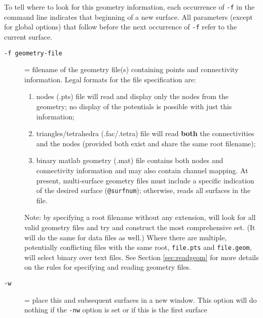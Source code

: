 To tell \map{} where to look for this geometry information, 
each occurrence of \texttt{-f} in the command line indicates that 
beginning of a new surface.  All parameters (except for global options)
that follow before the 
next occurrence of \texttt{-f} refer to the current surface.
%
\begin{description}
  \item[{\tt -f geometry-file} ]
    = filename of the geometry file(s) containing points and
    connectivity information.   Legal formats for the file specification 
    are: 
    \begin{enumerate}
      \item nodes (.pts) file will read and display only the 
        nodes from the geometry; no display of the potentials is 
        possible with just this information;
        
      \item triangles/tetrahedra (.fac/.tetra) file will read 
        \textbf{both} the connectivities and the nodes (provided
        both exist and share the same root filename);
        
      \item binary matlab geometry (.mat) file contains both nodes and 
        connectivity information and may also contain channel
        mapping.  At present, multi-surface geometry files must
	include a specific indication of the desired surface
	(\texttt{@surfnum}); otherwise, \map{} reads all surfaces
	in the file.
    \end{enumerate}
    Note: by specifying a root filename without any extension, \map{} will
    look for all valid geometry files and try and construct the most
    comprehensive set.  (It will do the same for data files as well.)
    Where there are multiple, potentially
    conflicting files with the same root, \eg{} \texttt{file.pts} and
    \texttt{file.geom}, \map{} will select binary over text files.  
    See Section \ref{sec:readgeom} for more details on the rules for
    specifying and reading geometry files.  
    
  \item[{\tt-w}] = place this and subsequent surfaces in a new window.
    This option will do nothing if the \texttt{-nw} option is set or if
    this is the first surface
    
    

\end{description}
